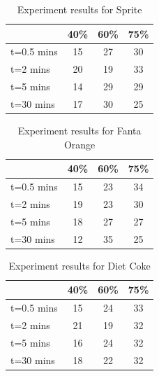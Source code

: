 \documentclass[oneside,12pt]{report}
\begin{document}
\begin{table}[ h]
\centering
\begin{tabular}{ l || c|c|c }
  &40\% &60\% & 75\%  \\
\hline  
t=0.5 mins & 15 & 27 & 30\\ 
\hline  
t=2 mins & 20 & 19 & 33\\ 
\hline  
t=5 mins & 14 & 29 & 29\\ 
\hline  
t=30 mins & 17 & 30 & 25\\ 
\hline  
   
 \end{tabular}

\caption{Experiment results for Sprite}

\end{table}
\begin{table}[ h]
\centering
\begin{tabular}{ l || c|c|c }
  &40\% &60\% & 75\%  \\
\hline  
t=0.5 mins & 15 & 23 & 34\\ 
\hline  
t=2 mins & 19 & 23 & 30\\ 
\hline  
t=5 mins & 18 & 27 & 27\\ 
\hline  
t=30 mins & 12 & 35 & 25\\ 
\hline  
   
 \end{tabular}

\caption{Experiment results for Fanta Orange}

\end{table}
\begin{table}[ h]
\centering
\begin{tabular}{ l || c|c|c }
  &40\% &60\% & 75\%  \\
\hline  
t=0.5 mins & 15 & 24 & 33\\ 
\hline  
t=2 mins & 21& 19 & 32\\ 
\hline  
t=5 mins & 16 & 24 & 32\\ 
\hline  
t=30 mins & 18 & 22& 32\\ 
\hline  
   
 \end{tabular}

\caption{Experiment results for Diet Coke}

\end{table}

\renewcommand{\thefootnote}{\arabic{footnote}}
\setcounter{footnote}{0}

%
\end{document}
